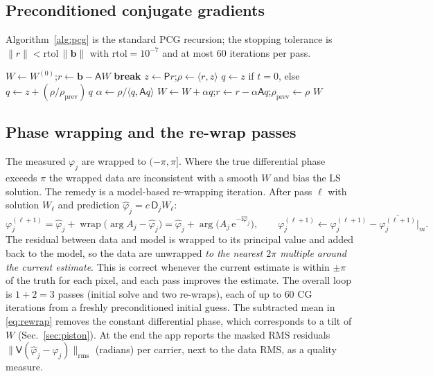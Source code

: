 \documentclass[11pt,a4paper]{article}
\theoremstyle{definition}
\newcommand{\ii}{\mathrm{i}}
\newcommand{\ee}{\mathrm{e}}
\newcommand{\Dop}{\mathsf{D}}
\newcommand{\Vop}{\mathsf{V}}
\newcommand{\Aop}{\mathsf{A}}
\newcommand{\Pop}{\mathsf{P}}
\newcommand{\wrap}{\operatorname{wrap}}
\begin{document}
\subsection{Preconditioned conjugate gradients}
Algorithm~\ref{alg:pcg} is the standard PCG recursion; the stopping tolerance is $\|r\|<\mathrm{rtol}\,\|\bm b\|$ with $\mathrm{rtol}=10^{-7}$ and at most $60$ iterations per pass.
\begin{algorithm}[h]
\caption{PCG for $\Aop W=\bm b$ (one pass)}
\label{alg:pcg}
\begin{algorithmic}[1]
\State $W\gets W^{(0)}$;\quad $r\gets\bm b-\Aop W$
   \textbf{break} \EndIf
  \State $z\gets\Pop r$;\quad $\rho\gets\langle r,z\rangle$
  \State $q\gets z$ if $t=0$, else $q\gets z+(\rho/\rho_{\text{prev}})\,q$
  \State $\alpha\gets\rho/\langle q,\Aop q\rangle$
  \State $W\gets W+\alpha q$;\quad $r\gets r-\alpha\Aop q$;\quad $\rho_{\text{prev}}\gets\rho$
\EndFor
\State \Return $W$
\end{algorithmic}
\end{algorithm}

\subsection{Phase wrapping and the re-wrap passes}
The measured $\varphi_j$ are wrapped to $(-\pi,\pi]$. Where the true differential phase exceeds $\pi$ the wrapped data are inconsistent with a smooth $W$ and bias the LS solution.
The remedy is a model-based re-wrapping iteration. After pass $\ell$ with solution $W_\ell$ and prediction $\hat\varphi_j=c\,\Dop_jW_\ell$:
\begin{equation}
\varphi_j^{(\ell+1)}=\hat\varphi_j+\wrap\!\Big(\arg A_j-\hat\varphi_j\Big)=\hat\varphi_j+\arg\!\big(A_j\,\ee^{-\ii\hat\varphi_j}\big),
\qquad \varphi_j^{(\ell+1)}\leftarrow\varphi_j^{(\ell+1)}-\overline{\varphi_j^{(\ell+1)}}\big|_m .
\label{eq:rewrap}
\end{equation}
The residual between data and model is wrapped to its principal value and added back to the model, so the data are unwrapped \emph{to the nearest $2\pi$ multiple around the current estimate}.
This is correct whenever the current estimate is within $\pm\pi$ of the truth for each pixel, and each pass improves the estimate. The overall loop is $1+2=3$ passes (initial solve and two re-wraps),
each of up to $60$ CG iterations from a freshly preconditioned initial guess. The subtracted mean in \eqref{eq:rewrap} removes the constant differential phase, which corresponds to a tilt of $W$ (Sec.~\ref{sec:piston}).
At the end the app reports the masked RMS residuals $\big\|\Vop(\hat\varphi_j-\varphi_j)\big\|_{\mathrm{rms}}$ (radians) per carrier, next to the data RMS, as a quality measure.
\end{document}
